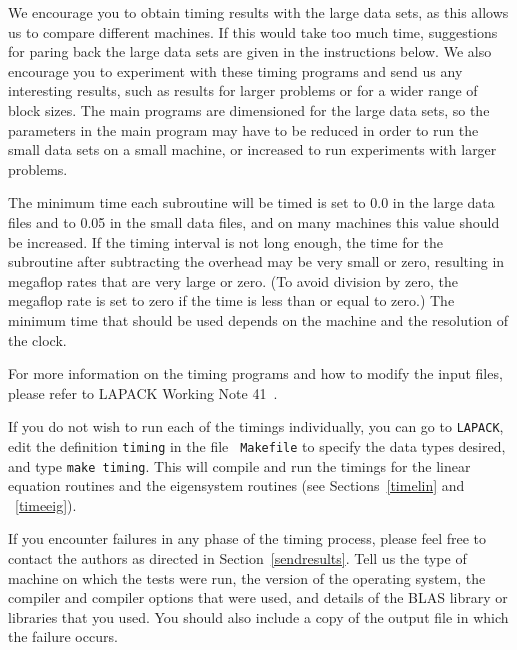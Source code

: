 We encourage you to obtain timing results with the large data sets,
as this allows us to compare different machines.
If this would take too much time, suggestions for paring back the large
data sets are given in the instructions below.
We also encourage you to experiment with these timing
programs and send us any interesting results, such as results for
larger problems or for a wider range of block sizes.
The main programs are dimensioned for the large data sets,
so the parameters in the main program may have to be reduced in order
to run the small data sets on a small machine, or increased to run
experiments with larger problems.

The minimum time each subroutine will be timed is set to 0.0 in
the large data files and to 0.05 in the small data files, and on
many machines this value should be increased.
If the timing interval is not long
enough, the time for the subroutine after subtracting the overhead
may be very small or zero, resulting in megaflop rates that are
very large or zero. (To avoid division by zero, the megaflop rate is
set to zero if the time is less than or equal to zero.)
The minimum time that should be used depends on the machine and the
resolution of the clock.

For more information on the timing programs and how to modify the
input files, please refer to LAPACK Working Note 41~\cite{WN41}.

If you do not wish to run each of the timings individually, you can
go to {\tt LAPACK}, edit the definition {\tt timing} in the file {\tt
Makefile} to specify the data types desired, and type {\tt make
timing}.  This will compile
and run the timings for the linear equation routines and the eigensystem
routines (see Sections~\ref{timelin} and ~\ref{timeeig}). 


If you encounter failures in any phase of the timing process, please
feel free to contact the authors as directed in Section~\ref{sendresults}.
Tell us the 
type of machine on which the tests were run, the version of the operating
system, the compiler and compiler options that were used,
and details of the BLAS library or libraries that you used.  You should
also include a copy of the output file in which the failure occurs.


